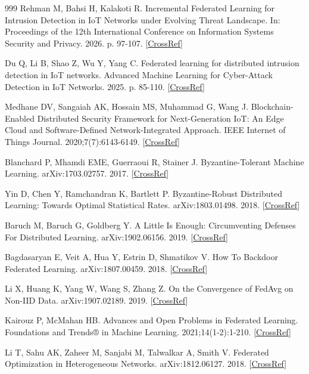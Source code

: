 \documentclass[cmc,article,submit,moreauthors,pdftex]{Definitions/tsp}
\begin{document}
\begin{thebibliography}{999}
Rehman M, Bahsi H, Kalakoti R. Incremental Federated Learning for Intrusion Detection in IoT Networks under Evolving Threat Landscape. In: Proceedings of the 12th International Conference on Information Systems Security and Privacy. 2026. p. 97-107. [\href{https://doi.org/10.5220/0014475900004061}{CrossRef}]

Du Q, Li B, Shao Z, Wu Y, Yang C. Federated learning for distributed intrusion detection in IoT networks. Advanced Machine Learning for Cyber-Attack Detection in IoT Networks. 2025. p. 85-110. [\href{https://doi.org/10.1016/b978-0-44-329032-9.00009-9}{CrossRef}]

Medhane DV, Sangaiah AK, Hossain MS, Muhammad G, Wang J. Blockchain-Enabled Distributed Security Framework for Next-Generation IoT: An Edge Cloud and Software-Defined Network-Integrated Approach. IEEE Internet of Things Journal. 2020;7(7):6143-6149. [\href{https://doi.org/10.1109/jiot.2020.2977196}{CrossRef}]

Blanchard P, Mhamdi EME, Guerraoui R, Stainer J. Byzantine-Tolerant Machine Learning. arXiv:1703.02757. 2017. [\href{https://doi.org/10.48550/arXiv.1703.02757}{CrossRef}]

Yin D, Chen Y, Ramchandran K, Bartlett P. Byzantine-Robust Distributed Learning: Towards Optimal Statistical Rates. arXiv:1803.01498. 2018. [\href{https://doi.org/10.48550/arXiv.1803.01498}{CrossRef}]

Baruch M, Baruch G, Goldberg Y. A Little Is Enough: Circumventing Defenses For Distributed Learning. arXiv:1902.06156. 2019. [\href{https://doi.org/10.48550/arXiv.1902.06156}{CrossRef}]

Bagdasaryan E, Veit A, Hua Y, Estrin D, Shmatikov V. How To Backdoor Federated Learning. arXiv:1807.00459. 2018. [\href{https://doi.org/10.48550/arXiv.1807.00459}{CrossRef}]

Li X, Huang K, Yang W, Wang S, Zhang Z. On the Convergence of FedAvg on Non-IID Data. arXiv:1907.02189. 2019. [\href{https://doi.org/10.48550/arXiv.1907.02189}{CrossRef}]

Kairouz P, McMahan HB. Advances and Open Problems in Federated Learning. Foundations and Trends® in Machine Learning. 2021;14(1-2):1-210. [\href{https://doi.org/10.1561/2200000083}{CrossRef}]

Li T, Sahu AK, Zaheer M, Sanjabi M, Talwalkar A, Smith V. Federated Optimization in Heterogeneous Networks. arXiv:1812.06127. 2018. [\href{https://doi.org/10.48550/arXiv.1812.06127}{CrossRef}]


\end{thebibliography}
\end{document}
